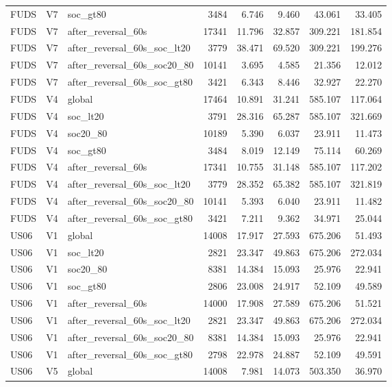 \begin{tabular}{lllrrrrr}
FUDS & V7 & soc\_gt80 & 3484 & 6.746 & 9.460 & 43.061 & 33.405 \\
FUDS & V7 & after\_reversal\_60s & 17341 & 11.796 & 32.857 & 309.221 & 181.854 \\
FUDS & V7 & after\_reversal\_60s\_soc\_lt20 & 3779 & 38.471 & 69.520 & 309.221 & 199.276 \\
FUDS & V7 & after\_reversal\_60s\_soc20\_80 & 10141 & 3.695 & 4.585 & 21.356 & 12.012 \\
FUDS & V7 & after\_reversal\_60s\_soc\_gt80 & 3421 & 6.343 & 8.446 & 32.927 & 22.270 \\
FUDS & V4 & global & 17464 & 10.891 & 31.241 & 585.107 & 117.064 \\
FUDS & V4 & soc\_lt20 & 3791 & 28.316 & 65.287 & 585.107 & 321.669 \\
FUDS & V4 & soc20\_80 & 10189 & 5.390 & 6.037 & 23.911 & 11.473 \\
FUDS & V4 & soc\_gt80 & 3484 & 8.019 & 12.149 & 75.114 & 60.269 \\
FUDS & V4 & after\_reversal\_60s & 17341 & 10.755 & 31.148 & 585.107 & 117.202 \\
FUDS & V4 & after\_reversal\_60s\_soc\_lt20 & 3779 & 28.352 & 65.382 & 585.107 & 321.819 \\
FUDS & V4 & after\_reversal\_60s\_soc20\_80 & 10141 & 5.393 & 6.040 & 23.911 & 11.482 \\
FUDS & V4 & after\_reversal\_60s\_soc\_gt80 & 3421 & 7.211 & 9.362 & 34.971 & 25.044 \\
US06 & V1 & global & 14008 & 17.917 & 27.593 & 675.206 & 51.493 \\
US06 & V1 & soc\_lt20 & 2821 & 23.347 & 49.863 & 675.206 & 272.034 \\
US06 & V1 & soc20\_80 & 8381 & 14.384 & 15.093 & 25.976 & 22.941 \\
US06 & V1 & soc\_gt80 & 2806 & 23.008 & 24.917 & 52.109 & 49.589 \\
US06 & V1 & after\_reversal\_60s & 14000 & 17.908 & 27.589 & 675.206 & 51.521 \\
US06 & V1 & after\_reversal\_60s\_soc\_lt20 & 2821 & 23.347 & 49.863 & 675.206 & 272.034 \\
US06 & V1 & after\_reversal\_60s\_soc20\_80 & 8381 & 14.384 & 15.093 & 25.976 & 22.941 \\
US06 & V1 & after\_reversal\_60s\_soc\_gt80 & 2798 & 22.978 & 24.887 & 52.109 & 49.591 \\
US06 & V5 & global & 14008 & 7.981 & 14.073 & 503.350 & 36.970 \\

\end{tabular}
